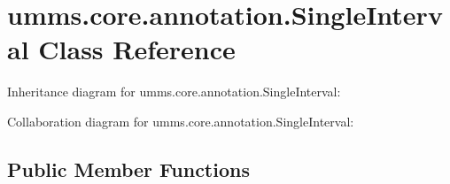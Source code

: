 \hypertarget{classumms_1_1core_1_1annotation_1_1_single_interval}{\section{umms.\+core.\+annotation.\+Single\+Interval Class Reference}
\label{classumms_1_1core_1_1annotation_1_1_single_interval}
}


Inheritance diagram for umms.\+core.\+annotation.\+Single\+Interval\+:


Collaboration diagram for umms.\+core.\+annotation.\+Single\+Interval\+:
\subsection*{Public Member Functions}
